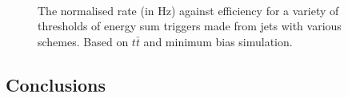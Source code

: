 \begin{figure}
  \centering
  \\
  \caption{ The normalised rate (in Hz) against efficiency for a
  variety of thresholds of energy sum
  triggers made from jets with various \PUS schemes. Based on
  $t\bar{t}$ and minimum bias \MC simulation.}
  \label{fig:rateEffJet}
\end{figure}

\subsection{Conclusions}

